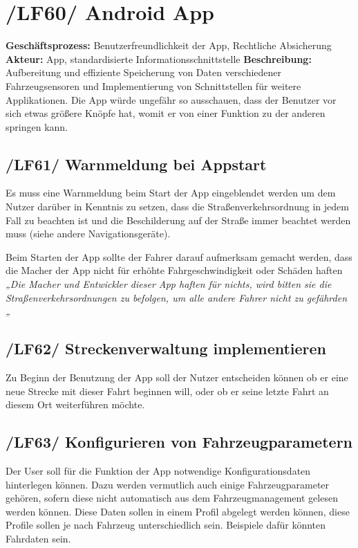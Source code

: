 \newpage

\section{/LF60/ Android App}
\textbf{Geschäftsprozess:}	Benutzerfreundlichkeit der App, Rechtliche Absicherung
\textbf{Akteur:}			App, standardisierte Informationsschnittstelle
\textbf{Beschreibung:}	Aufbereitung und effiziente Speicherung von Daten verschiedener Fahrzeugsensoren und Implementierung von Schnittstellen für weitere Applikationen. 
Die App würde ungefähr so ausschauen, dass der Benutzer vor sich etwas größere Knöpfe hat,                                        
womit er von einer Funktion zu der anderen springen kann.

\subsection{/LF61/ Warnmeldung bei Appstart}
\nextline
Es muss eine Warnmeldung beim Start der App eingeblendet werden um dem Nutzer darüber in Kenntnis zu setzen, dass die Straßenverkehrsordnung in jedem Fall zu beachten ist und die Beschilderung auf der Straße immer beachtet werden muss (siehe andere Navigationsgeräte).

Beim Starten der App sollte der Fahrer darauf aufmerksam gemacht werden, dass die Macher der App nicht für erhöhte Fahrgeschwindigkeit oder Schäden haften
\emph{„Die Macher und Entwickler dieser App haften für nichts, wird bitten sie die Straßenverkehrsordnungen zu befolgen, um alle andere Fahrer nicht zu gefährden „}

\subsection{/LF62/ Streckenverwaltung implementieren}
\nextline
Zu Beginn der Benutzung der App soll der Nutzer entscheiden können ob er eine neue Strecke mit dieser Fahrt beginnen will, oder ob er seine letzte Fahrt an diesem Ort weiterführen möchte.

\subsection{/LF63/ Konfigurieren von Fahrzeugparametern}
\nextline
Der User soll für die Funktion der App notwendige Konfigurationsdaten hinterlegen können. Dazu werden vermutlich auch einige Fahrzeugparameter gehören, sofern diese nicht automatisch aus dem Fahrzeugmanagement gelesen werden können. Diese Daten sollen in einem Profil abgelegt werden können, diese Profile sollen je nach Fahrzeug unterschiedlich sein. Beispiele dafür könnten Fahrdaten sein.

